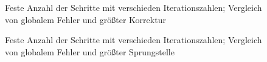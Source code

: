 \begin{figure}[ht]
    \centering
        
    \caption{Feste Anzahl der Schritte mit verschieden Iterationszahlen; Vergleich von globalem Fehler und größter Korrektur}
    \label{fig:error_corr}
\end{figure}
\begin{figure}[ht]
    \centering
        
    \caption{Feste Anzahl der Schritte mit verschieden Iterationszahlen; Vergleich von globalem Fehler und größter Sprungstelle}
    \label{fig:error_disc}
\end{figure}

